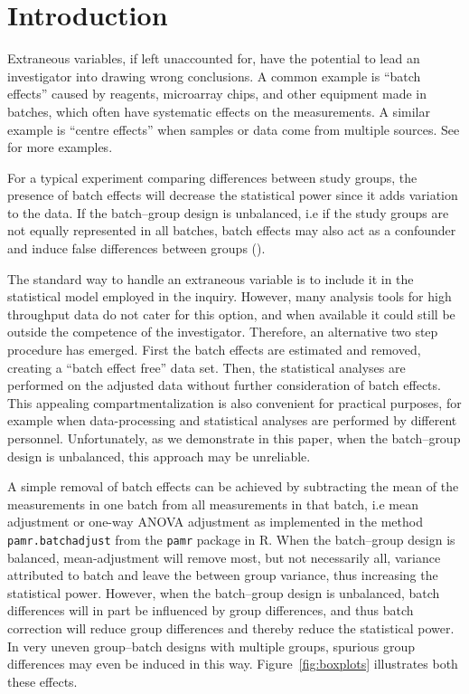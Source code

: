 \documentclass{bio}
\begin{document}
\section{Introduction}\label{intro}

Extraneous variables, if left unaccounted for, have the potential to lead an investigator into drawing wrong conclusions. A common example is ``batch effects'' caused by reagents, microarray chips, and other equipment made in batches, which often have systematic effects on the measurements. A similar example is ``centre effects'' when samples or data come from multiple sources. See \citet{Luo2010} for more examples.

For a typical experiment comparing differences between study groups, the presence of batch effects will decrease the statistical power since it adds variation to the data. If the batch--group design is unbalanced, i.e if the study groups are not equally represented in all batches, batch effects may also act as a confounder and induce false differences between groups (\citealp{Leek2010}).

The standard way to handle an extraneous variable is to include it in the statistical model employed in the inquiry. However, many analysis tools for high throughput data do not cater for this option, and when available it could still be outside the competence of the investigator. Therefore, an alternative two step procedure has emerged. First the batch effects are estimated and removed, creating a ``batch effect free'' data set. Then, the statistical analyses are performed on the adjusted data without further consideration of batch effects. This appealing compartmentalization is also convenient for practical purposes, for example when data-processing and statistical analyses are performed by different personnel. Unfortunately, as we demonstrate in this paper, when the batch--group design is unbalanced, this approach may be unreliable.

A simple removal of batch effects can be achieved by subtracting the mean of the measurements in one batch from all measurements in that batch, i.e mean adjustment or one-way ANOVA adjustment as implemented in the method \texttt{pamr.batchadjust} from the \texttt{pamr} package in R. When the batch--group design is balanced, mean-adjustment will remove most, but not necessarily all, variance attributed to batch and leave the between group variance, thus increasing the statistical power. However, when the batch--group design is unbalanced, batch differences will in part be influenced by group differences, and thus batch correction will reduce group differences and thereby reduce the statistical power. In very uneven group--batch designs with multiple groups, spurious group differences may even be induced in this way. Figure~\ref{fig:boxplots} illustrates both these effects.
\end{document}
